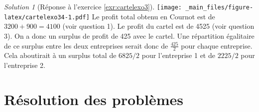 \documentclass[
]{book}
\theoremstyle{definition}
\theoremstyle{definition}
\theoremstyle{definition}
\theoremstyle{definition}
\theoremstyle{remark}
\newtheorem*{solution}{Solution}
\begin{document}
\begin{solution}[Réponse à l'exercice \ref{exr:cartelexo3}]
\texttt{[image: \_main\_files/figure-latex/cartelexo34-1.pdf]}
Le profit total obtenu en Cournot est de \(3200+900=4100\) (voir question 1).
Le profit du cartel est de 4525 (voir question 3).
On a donc un surplus de profit de 425 avec le cartel.
Une répartition égalitaire de ce surplus entre les deux entreprises serait donc de \(\frac{425}{2}\) pour chaque entreprise.
Cela aboutirait à un surplus total de \(6825/2\) pour l'entreprise 1 et de \(2225/2\) pour l'entreprise 2.
\end{solution}

\hypertarget{appendix-annexes}{%
\appendix}


\hypertarget{ruxe9solution-des-probluxe8mes}{%
\chapter{Résolution des problèmes}\label{ruxe9solution-des-probluxe8mes}}
\end{document}
